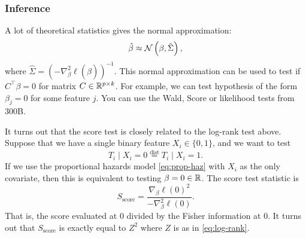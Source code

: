 \subsubsection*{Inference}
A lot of theoretical statistics gives the normal approximation:
\[\hat{\beta} \approx {\mathcal N}\left(\beta, \hat{\Sigma}\right), \]
where $\hat{\Sigma} = \left(-\nabla^2_\beta \ell(\hat{\beta})\right)^{-1}$. This normal approximation can be used to test if $C^\top\beta = 0$ for matrix $C \in \mathbb{R}^{p \times k}$. For example, we can test hypothesis of the form $\beta_j=0$ for some feature $j$. You can use the Wald, Score or likelihood tests from 300B.

It turns out that the score test is closely related to the log-rank test above. Suppose that we have a single binary feature $X_i \in \{0,1\}$, and we want to test 
\[T_i \mid X_i=0 \stackrel{\text{dist}}{=} T_i \mid X_i = 1.\] 
If we use the proportional hazards model \eqref{eq:prop-haz} with $X_i$ as the only covariate, then this is equivalent to testing $\beta=0 \in \mathbb{R}$. The score test statistic is
\[S_{\text{score}} = \frac{\nabla_\beta \ell(0)^2}{-\nabla_\beta^2 \ell(0)}.\]
That is, the score evaluated at $0$ divided by the Fisher information at $0$. It turns out that $S_{\text{score}}$ is exactly equal to $Z^2$ where $Z$ is as in \eqref{eq:log-rank}. 